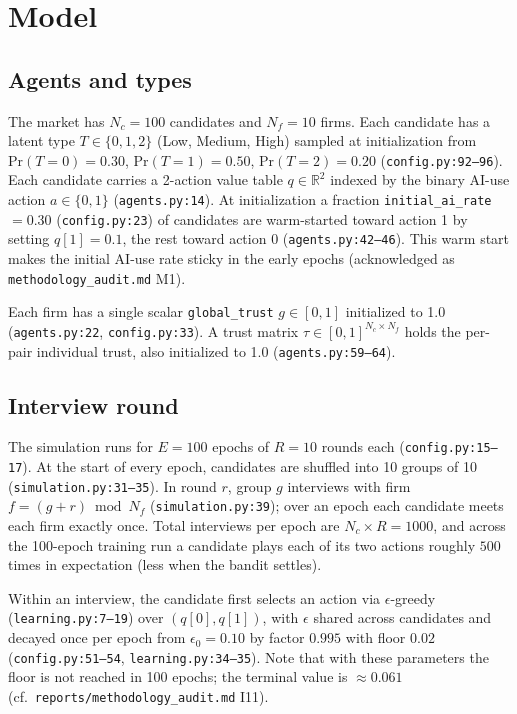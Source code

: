 \documentclass[11pt]{article}
\begin{document}
\section{Model}\label{sec:model}

\subsection{Agents and types}

The market has \(N_{c}=100\) candidates and \(N_{f}=10\) firms.
Each candidate has a latent type \(T \in \{0,1,2\}\) (Low, Medium, High)
sampled at initialization from \(\mathrm{Pr}(T=0)=0.30\), \(\mathrm{Pr}(T=1)=0.50\),
\(\mathrm{Pr}(T=2)=0.20\) (\texttt{config.py:92--96}).
Each candidate carries a 2-action value table \(q \in \mathbb{R}^{2}\)
indexed by the binary AI-use action \(a \in \{0,1\}\)
(\texttt{agents.py:14}).
At initialization a fraction \texttt{initial\_ai\_rate} \(=0.30\)
(\texttt{config.py:23}) of candidates are warm-started toward action 1
by setting \(q[1]=0.1\), the rest toward action 0
(\texttt{agents.py:42--46}). This warm start makes the initial AI-use rate
sticky in the early epochs (acknowledged as \texttt{methodology\_audit.md} M1).

Each firm has a single scalar \texttt{global\_trust} \(g \in [0,1]\) initialized
to 1.0 (\texttt{agents.py:22}, \texttt{config.py:33}).
A trust matrix \(\tau \in [0,1]^{N_{c} \times N_{f}}\) holds the per-pair
individual trust, also initialized to 1.0 (\texttt{agents.py:59--64}).

\subsection{Interview round}

The simulation runs for \(E=100\) epochs of \(R=10\) rounds each
(\texttt{config.py:15--17}). At the start of every epoch, candidates are
shuffled into 10 groups of 10 (\texttt{simulation.py:31--35}). In round \(r\),
group \(g\) interviews with firm \(f = (g + r) \bmod N_{f}\)
(\texttt{simulation.py:39}); over an epoch each candidate meets each firm
exactly once. Total interviews per epoch are
\(N_{c} \times R = 1000\), and across the 100-epoch training run a candidate
plays each of its two actions roughly \(500\) times in expectation
(less when the bandit settles).

Within an interview, the candidate first selects an action via
\(\epsilon\)-greedy (\texttt{learning.py:7--19}) over \((q[0], q[1])\),
with \(\epsilon\) shared across candidates and decayed once per epoch from
\(\epsilon_{0}=0.10\) by factor \(0.995\) with floor \(0.02\)
(\texttt{config.py:51--54}, \texttt{learning.py:34--35}). Note that with these
parameters the floor is not reached in 100 epochs; the terminal value is
\(\approx 0.061\) (cf.\ \texttt{reports/methodology\_audit.md} I11).
\end{document}

